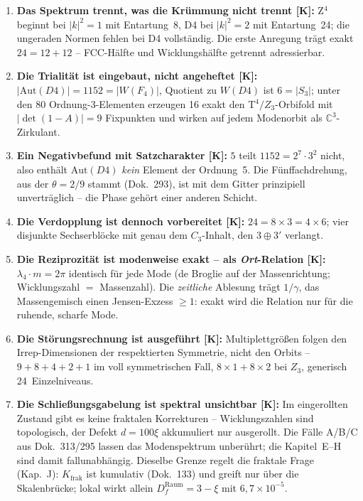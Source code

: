 \begin{enumerate}
  \item \textbf{Das Spektrum trennt, was die Krümmung nicht trennt
        [K]:} Z$^4$ beginnt bei $|k|^2 = 1$ mit Entartung~8, D4 bei
        $|k|^2 = 2$ mit Entartung~24; die ungeraden Normen fehlen
        bei D4 vollständig. Die erste Anregung trägt exakt
        $24 = 12+12$ -- FCC-Hälfte und Wicklungshälfte getrennt
        adressierbar.
  \item \textbf{Die Trialität ist eingebaut, nicht angeheftet [K]:}
        $|\text{Aut}(D4)| = 1152 = |W(F_4)|$, Quotient zu $W(D4)$
        ist $6 = |S_3|$; unter den 80 Ordnung-3-Elementen erzeugen
        16 exakt den T$^4/Z_3$-Orbifold mit $|\det(1-A)| = 9$
        Fixpunkten und wirken auf jedem Modenorbit als
        $\mathbb{C}^3$-Zirkulant.
  \item \textbf{Ein Negativbefund mit Satzcharakter [K]:} $5$ teilt
        $1152 = 2^7\cdot3^2$ nicht, also enthält $\text{Aut}(D4)$
        \emph{kein} Element der Ordnung~5. Die Fünffachdrehung, aus
        der $\theta = 2/9$ stammt (Dok.~293), ist mit dem Gitter
        prinzipiell unverträglich -- die Phase gehört einer
        anderen Schicht.
  \item \textbf{Die Verdopplung ist dennoch vorbereitet [K]:}
        $24 = 8\times3 = 4\times6$; vier disjunkte Sechserblöcke mit
        genau dem $C_3$-Inhalt, den $3\oplus3'$ verlangt.
  \item \textbf{Die Reziprozität ist modenweise exakt -- als
        \emph{Ort}-Relation [K]:} $\lambda_4\cdot m = 2\pi$
        identisch für jede Mode (de Broglie auf der
        Massenrichtung; Wicklungszahl $=$ Massenzahl). Die
        \emph{zeitliche} Ablesung trägt $1/\gamma$, das
        Massengemisch einen Jensen-Exzess $\ge1$: exakt wird die
        Relation nur für die ruhende, scharfe Mode.
  \item \textbf{Die Störungsrechnung ist ausgeführt [K]:}
        Multiplettgrößen folgen den Irrep-Dimensionen der
        respektierten Symmetrie, nicht den Orbits --
        $9+8+4+2+1$ im voll symmetrischen Fall, $8\times1+8\times2$
        bei $Z_3$, generisch 24~Einzelniveaus.
  \item \textbf{Die Schließungsgabelung ist spektral unsichtbar
        [K]:} Im eingerollten Zustand gibt es keine fraktalen
        Korrekturen -- Wicklungszahlen sind topologisch, der
        Defekt $d = 100\xi$ akkumuliert nur ausgerollt. Die
        Fälle A/B/C aus Dok.~313/295 lassen das Modenspektrum
        unberührt; die Kapitel~E--H sind damit fallunabhängig.
        Dieselbe Grenze regelt die fraktale Frage (Kap.~J):
        $K_\text{frak}$ ist kumulativ (Dok.~133) und greift nur
        über die Skalenbrücke; lokal wirkt allein
        $D_f^\text{Raum} = 3-\xi$ mit $6{,}7\times10^{-5}$.
\end{enumerate}

